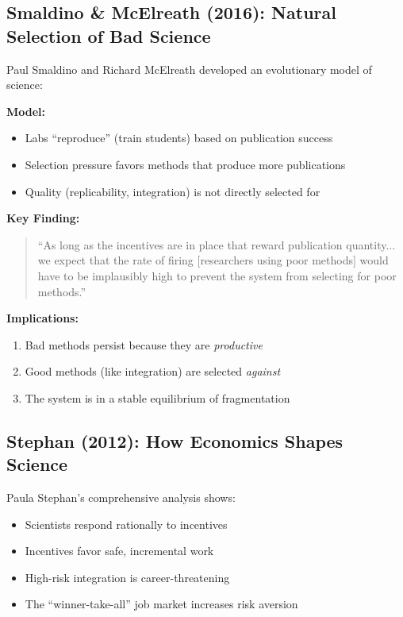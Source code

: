 \subsection{Smaldino \& McElreath (2016): Natural Selection of Bad Science}

Paul Smaldino and Richard McElreath developed an evolutionary model of science:

\textbf{Model:}
\begin{itemize}
\item Labs ``reproduce'' (train students) based on publication success
\item Selection pressure favors methods that produce more publications
\item Quality (replicability, integration) is not directly selected for
\end{itemize}

\textbf{Key Finding:}
\begin{quote}
``As long as the incentives are in place that reward publication quantity... we expect that the rate of firing [researchers using poor methods] would have to be implausibly high to prevent the system from selecting for poor methods.''
\end{quote}

\textbf{Implications:}
\begin{enumerate}
\item Bad methods persist because they are \textit{productive}
\item Good methods (like integration) are selected \textit{against}
\item The system is in a stable equilibrium of fragmentation
\end{enumerate}

\subsection{Stephan (2012): How Economics Shapes Science}

Paula Stephan's comprehensive analysis shows:
\begin{itemize}
\item Scientists respond rationally to incentives
\item Incentives favor safe, incremental work
\item High-risk integration is career-threatening
\item The ``winner-take-all'' job market increases risk aversion
\end{itemize}

